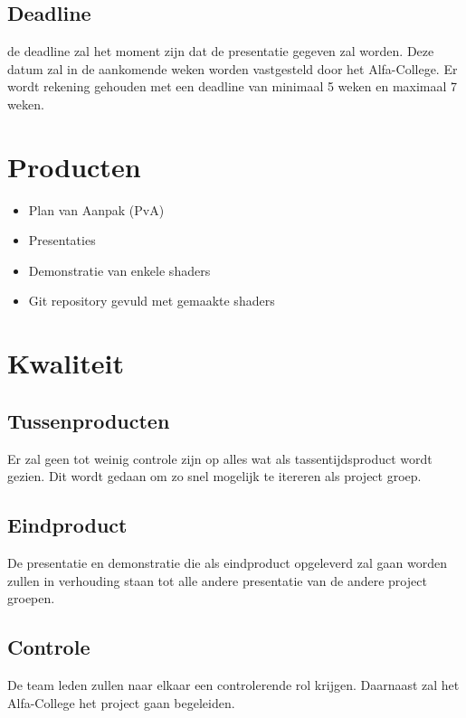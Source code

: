 \documentclass[]{report}
\begin{document}
\section{Deadline}
de deadline zal het moment zijn dat de presentatie gegeven zal worden. Deze datum zal in de aankomende weken worden vastgesteld door het Alfa-College. Er wordt rekening gehouden met een deadline van minimaal 5 weken en maximaal 7 weken.





\chapter{Producten}

\begin{itemize}
	\item Plan van Aanpak (PvA)
	\item Presentaties
	\item Demonstratie van enkele shaders
	\item Git repository gevuld met gemaakte shaders
		\newline
\end{itemize} 





\chapter{Kwaliteit}

\section{Tussenproducten}
Er zal geen tot weinig controle zijn op alles wat als tassentijdsproduct wordt gezien. Dit wordt gedaan om zo snel mogelijk te itereren als project groep.

\section{Eindproduct}	
De presentatie en demonstratie die als eindproduct opgeleverd zal gaan worden zullen in verhouding staan tot alle andere presentatie van de andere project groepen. 

\section{Controle}	
De team leden zullen naar elkaar een controlerende rol krijgen. Daarnaast zal het Alfa-College het project gaan begeleiden. 
\end{document}

